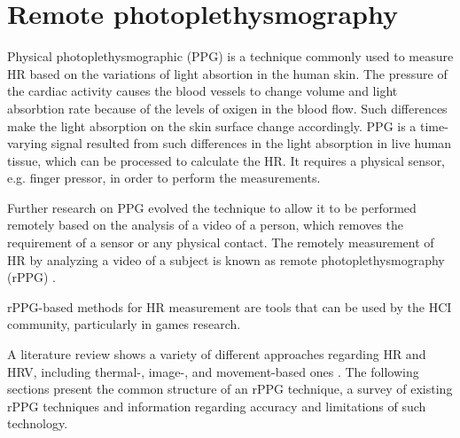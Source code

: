 \chapter{Remote photoplethysmography}

Physical photoplethysmographic (PPG) is a technique commonly used to measure HR based on the variations of light absortion in the human skin. The pressure of the cardiac activity causes the blood vessels to change volume and light absorbtion rate because of the levels of oxigen in the blood flow. Such differences make the light absorption on the skin surface change accordingly. PPG is a time-varying signal resulted from such differences in the light absorption in live human tissue, which can be processed to calculate the HR. It requires a physical sensor, e.g. finger pressor, in order to perform the measurements.


Further research on PPG \parencite{mcduff2015survey} evolved the technique to allow it to be performed remotely based on the analysis of a video of a person, which removes the requirement of a sensor or any physical contact. The remotely measurement of HR by analyzing a video of a subject is known as remote photoplethysmography (rPPG) \parencite{allen2007photoplethysmography}.

rPPG-based methods for HR measurement are tools that can be used by the HCI community, particularly in games research.

A literature review shows a variety of different approaches regarding HR and HRV, including thermal-, image-, and movement-based ones \parencite{kranjec2014non, Sereevoravitgul}. The following sections present the common structure of an rPPG technique, a survey of existing rPPG techniques and information regarding accuracy and limitations of such technology.


